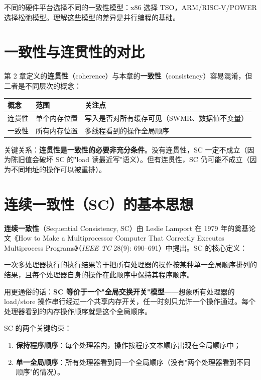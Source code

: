 不同的硬件平台选择不同的一致性模型：x86 选择 TSO，ARM/RISC-V/POWER 选择松弛模型。理解这些模型的差异是并行编程的基础。

\section{一致性与连贯性的对比}

第 2 章定义的\textbf{连贯性}（coherence）与本章的\textbf{一致性}（consistency）容易混淆，但二者是不同层次的概念：

\begin{center}
\begin{tabular}{lll}
\toprule
概念 & 范围 & 关注点 \\
\midrule
连贯性 & 单个内存位置 & 写入是否对所有缓存可见（SWMR、数据值不变量） \\
一致性 & 所有内存位置 & 多线程看到的操作全局顺序 \\
\bottomrule
\end{tabular}
\end{center}


关键关系：\textbf{连贯性是一致性的必要非充分条件}。没有连贯性，SC 一定不成立（因为陈旧值会破坏 SC 的"load 读最近写"语义）。但有连贯性，SC 仍可能不成立（因为不同地址的操作可以被重排）。

\section{连续一致性（SC）的基本思想}

\textbf{连续一致性}（Sequential Consistency, SC）由 Leslie Lamport 在 1979 年的奠基论文《How to Make a Multiprocessor Computer That Correctly Executes Multiprocess Programs》（\emph{IEEE TC} 28(9): 690–691）中提出。SC 的核心定义：

\begin{epigraph}
一次多处理器执行的执行结果等于把所有处理器的操作按某种单一全局顺序排列的结果，且每个处理器自身的操作在此顺序中保持其程序顺序。
\end{epigraph}


用更通俗的话：\textbf{SC 等价于一个"全局交换开关"模型}——想象所有处理器的 load/store 操作串行经过一个共享内存开关，任一时刻只允许一个操作通过。每个处理器看到的内存操作顺序就是这个全局顺序。

SC 的两个关键约束：

\begin{enumerate}
\item \textbf{保持程序顺序}：每个处理器内，操作按程序文本顺序出现在全局顺序中；
\item \textbf{单一全局顺序}：所有处理器看到同一个全局顺序（没有"两个处理器看到不同顺序"的情况）。
\end{enumerate}


